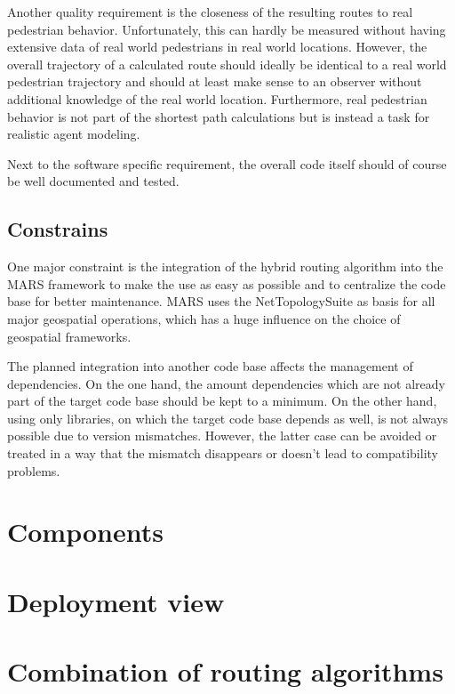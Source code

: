		Another quality requirement is the closeness of the resulting routes to real pedestrian behavior.
		Unfortunately, this can hardly be measured without having extensive data of real world pedestrians in real world locations.
		However, the overall trajectory of a calculated route should ideally be identical to a real world pedestrian trajectory and should at least make sense to an observer without additional knowledge of the real world location.
		Furthermore, real pedestrian behavior is not part of the shortest path calculations but is instead a task for realistic agent modeling.

		Next to the software specific requirement, the overall code itself should of course be well documented and tested.
	
	\subsection{Constrains}
		
		One major constraint is the integration of the hybrid routing algorithm into the MARS framework to make the use as easy as possible and to centralize the code base for better maintenance.
		MARS uses the NetTopologySuite as basis for all major geospatial operations, which has a huge influence on the choice of geospatial frameworks.
		
		The planned integration into another code base affects the management of dependencies.
		On the one hand, the amount dependencies which are not already part of the target code base should be kept to a minimum.
		On the other hand, using only libraries, on which the target code base depends as well, is not always possible due to version mismatches.
		However, the latter case can be avoided or treated in a way that the mismatch disappears or doesn't lead to compatibility problems.
	
	
\section{Components}

\section{Deployment view}


\section{Combination of routing algorithms}

